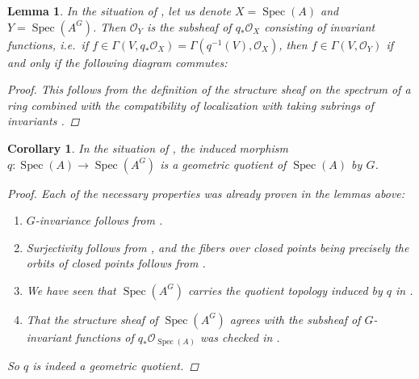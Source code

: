 \documentclass[12pt,a4paper]{amsart}
\theoremstyle{plain}
\newtheorem{lm}[thm]{Lemma}
\newtheorem{cor}[thm]{Corollary}
\theoremstyle{definition}
\theoremstyle{remark}
\begin{document}
\begin{lm}\label{lm:invariantslocalization}
  In the situation of , let us denote $X = \operatorname{Spec}(A)$ and $Y = \operatorname{Spec}(A^{G})$.
  Then $\mathscr{O}_{Y}$ is the subsheaf of $q_{*}\mathscr{O}_{X}$ consisting of invariant functions, i.e.~if $f \in \Gamma(V,q_{*}\mathscr{O}_{X}) = \Gamma(q^{-1}(V),\mathscr{O}_{X})$, then $f \in \Gamma(V, \mathscr{O}_{Y})$ if and only if the following diagram commutes:
  
  \begin{center}
  \end{center}

  \begin{proof}
    This follows from the definition of the structure sheaf on the spectrum of a ring combined with the compatibility of localization with taking subrings of invariants \cite[Exercise 5.12]{am69}.
  \end{proof}

\end{lm}

\begin{cor}\label{cor:affinequotient}
  In the situation of , the induced morphism $q \colon \operatorname{Spec}(A) \to \operatorname{Spec}(A^{G})$ is a geometric quotient of $\operatorname{Spec}(A)$ by $G$.

  \begin{proof}
    Each of the necessary properties was already proven in the lemmas above:
    \begin{enumerate}
      \item $G$-invariance follows from .
      \item Surjectivity follows from , and the fibers over closed points being precisely the orbits of closed points follows from .
      \item We have seen that $\operatorname{Spec}(A^{G})$ carries the quotient topology induced by $q$ in .
      \item That the structure sheaf of $\operatorname{Spec}(A^{G})$ agrees with the subsheaf of $G$-invariant functions of $q_{*}\mathscr{O}_{\operatorname{Spec}(A)}$ was checked in .
    \end{enumerate}
    So $q$ is indeed a geometric quotient.  
  \end{proof}

\end{cor}
\end{document}
